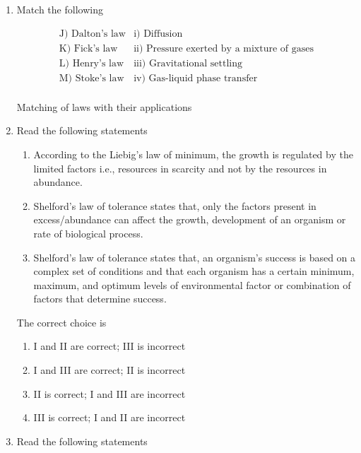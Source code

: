 \documentclass[journal,12pt,onecolumn]{IEEEtran}
\theoremstyle{remark}
\begin{document}
\begin{enumerate}
\newpage

\item Match the following

\begin{table}[h!]
\centering
\[
\begin{array}{ll}
\text{J) Dalton's law} & \text{i) Diffusion} \\
\text{K) Fick's law}   & \text{ii) Pressure exerted by a mixture of gases} \\
\text{L) Henry's law}  & \text{iii) Gravitational settling} \\
\text{M) Stoke's law}  & \text{iv) Gas-liquid phase transfer} \\
\end{array}
\]
\caption{Matching of laws with their applications}
\label{tab:laws}
\end{table}

\begin{enumerate}
\end{enumerate}
\hfill{}
\item Read the following statements

\begin{enumerate}[label=\Roman*.]
\item According to the Liebig's law of minimum, the growth is regulated by the limited factors i.e., resources in scarcity and not by the resources in abundance.
\item Shelford's law of tolerance states that, only the factors present in excess/abundance can affect the growth, development of an organism or rate of biological process.
\item Shelford's law of tolerance states that, an organism's success is based on a complex set of conditions and that each organism has a certain minimum, maximum, and optimum levels of environmental factor or combination of factors that determine success.
\end{enumerate}

The correct choice is

\begin{enumerate}
\item I and II are correct; III is incorrect
\item I and III are correct; II is incorrect
\item II is correct; I and III are incorrect
\item III is correct; I and II are incorrect
\end{enumerate}
\hfill{}
\item Read the following statements


\end{enumerate}
\end{document}
